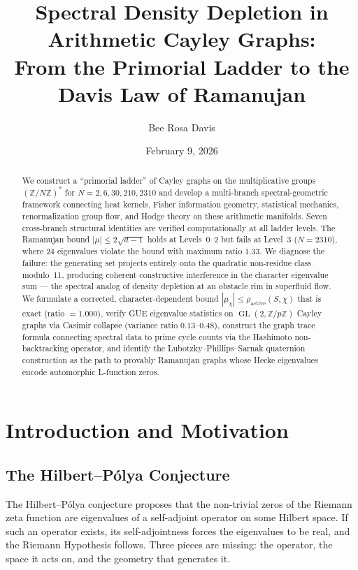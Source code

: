 \documentclass[12pt,reqno]{amsart}
\title[Spectral Density Depletion in Arithmetic Cayley Graphs]
{Spectral Density Depletion in Arithmetic Cayley Graphs:\\
  From the Primorial Ladder to the Davis Law of Ramanujan}
\author{Bee Rosa Davis}
\date{February 9, 2026}
\theoremstyle{plain}
\theoremstyle{definition}
\theoremstyle{remark}
\DeclareMathOperator{\GL}{GL}
\newcommand{\ZZ}{\mathbb{Z}}
\begin{document}
\begin{abstract}
We construct a ``primorial ladder'' of Cayley graphs on the
multiplicative groups $(\ZZ/N\ZZ)^*$ for $N = 2, 6, 30, 210, 2310$
and develop a multi-branch spectral-geometric framework connecting
heat kernels, Fisher information geometry, statistical mechanics,
renormalization group flow, and Hodge theory on these arithmetic
manifolds.  Seven cross-branch structural identities are verified
computationally at all ladder levels.  The Ramanujan bound $|\mu| \leq
2\sqrt{d-1}$ holds at Levels~0--2 but fails at Level~3 ($N=2310$),
where 24 eigenvalues violate the bound with maximum ratio $1.33$.  We
diagnose the failure: the generating set projects entirely onto the
quadratic non-residue class modulo~11, producing coherent constructive
interference in the character eigenvalue sum --- the spectral analog of
density depletion at an obstacle rim in superfluid flow.  We formulate
a corrected, character-dependent bound $|\mu_\chi| \leq
\rho_{\mathrm{active}}(S,\chi)$ that is exact (ratio $= 1.000$),
verify GUE eigenvalue statistics on $\GL(2,\ZZ/p\ZZ)$ Cayley graphs
via Casimir collapse (variance ratio $0.13$--$0.48$), construct the
graph trace formula connecting spectral data to prime cycle counts via
the Hashimoto non-backtracking operator, and identify the
Lubotzky--Phillips--Sarnak quaternion construction as the path to
provably Ramanujan graphs whose Hecke eigenvalues encode automorphic
L-function zeros.
\end{abstract}

\maketitle

\tableofcontents


\section{Introduction and Motivation}\label{sec:intro}

\subsection{The Hilbert--P\'olya Conjecture}

The Hilbert--P\'olya conjecture proposes that the non-trivial zeros of
the Riemann zeta function are eigenvalues of a self-adjoint operator
on some Hilbert space.  If such an operator exists, its
self-adjointness forces the eigenvalues to be real, and the Riemann
Hypothesis follows.  Three pieces are missing: the operator, the space
it acts on, and the geometry that generates it.
\end{document}

